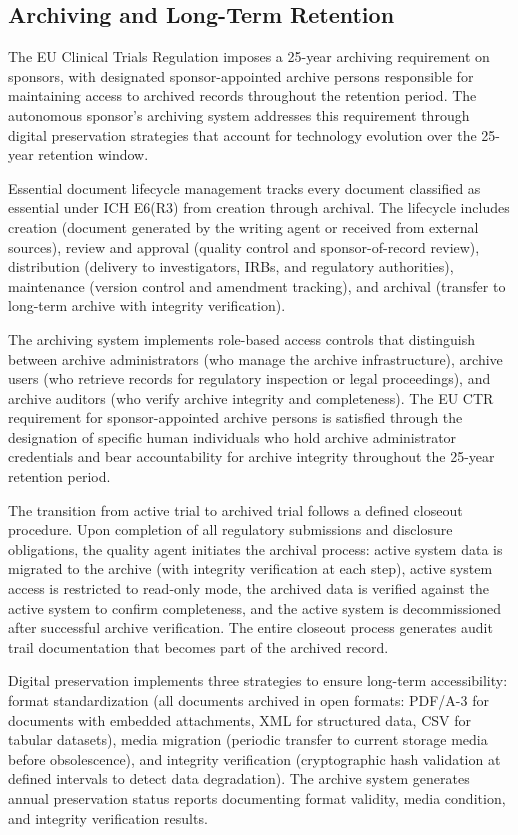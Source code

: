 \subsection{Archiving and Long-Term Retention}

The EU Clinical Trials Regulation imposes a 25-year archiving requirement
\cite{eu-ctr} on sponsors, with designated sponsor-appointed archive persons responsible
for maintaining access to archived records throughout the retention period. The autonomous
sponsor's archiving system addresses this requirement through digital preservation
strategies that account for technology evolution over the 25-year retention window.

Essential document lifecycle management tracks every document classified as essential
under ICH E6(R3) from creation through archival. The lifecycle includes creation
(document generated by the writing agent or received from external sources), review
and approval (quality control and sponsor-of-record review), distribution (delivery to
investigators, IRBs, and regulatory authorities), maintenance (version control and
amendment tracking), and archival (transfer to long-term archive with integrity
verification).

The archiving system implements role-based access controls that distinguish between
archive administrators (who manage the archive infrastructure), archive users (who
retrieve records for regulatory inspection or legal proceedings), and archive auditors
(who verify archive integrity and completeness). The EU CTR requirement for
sponsor-appointed archive persons is satisfied through the designation of specific
human individuals who hold archive administrator credentials and bear accountability
for archive integrity throughout the 25-year retention period.

The transition from active trial to archived trial follows a defined closeout procedure.
Upon completion of all regulatory submissions and disclosure obligations, the quality
agent initiates the archival process: active system data is migrated to the archive
(with integrity verification at each step), active system access is restricted to
read-only mode, the archived data is verified against the active system to confirm
completeness, and the active system is decommissioned after successful archive
verification. The entire closeout process generates audit trail documentation that
becomes part of the archived record.

Digital preservation implements three strategies to ensure long-term accessibility:
format standardization (all documents archived in open formats: PDF/A-3 for documents
with embedded attachments, XML for structured data, CSV for tabular datasets), media
migration (periodic transfer to current storage media before obsolescence), and
integrity verification (cryptographic hash validation at defined intervals to detect
data degradation). The archive system generates annual preservation status reports
documenting format validity, media condition, and integrity verification results.
